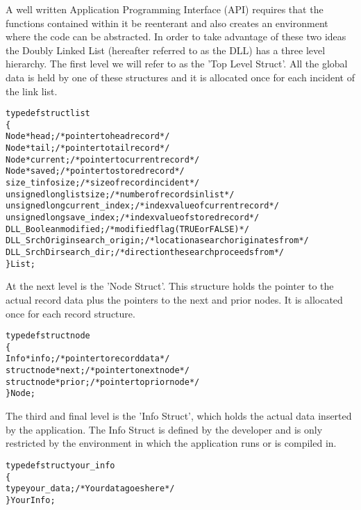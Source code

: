 \documentclass[10pt,letterpaper]{report}
\begin{document}
\noindent
A well written Application Programming Interface (API) requires that the functions contained within it be reenterant and also creates an environment where the code can be abstracted.  In order to take advantage of these two ideas the Doubly Linked List (hereafter referred to as the DLL) has a three level hierarchy.  The first level we will refer to as the 'Top Level Struct'.  All the global data is held by one of these structures and it is allocated once for each incident of the link list.  


\small
\begin{alltt}
typedef struct list
   \{
   Node           *head;         /* pointer to head record */
   Node           *tail;         /* pointer to tail record */
   Node           *current;      /* pointer to current record */
   Node           *saved;        /* pointer to stored record */
   size_t         infosize;      /* size of record incident */
   unsigned long  listsize;      /* number of records in list */
   unsigned long  current_index; /* index value of current record */
   unsigned long  save_index;    /* index value of stored record */
   DLL_Boolean    modified;      /* modified flag (TRUE or FALSE) */
   DLL_SrchOrigin search_origin; /* location a search originates from */
   DLL_SrchDir    search_dir;    /* direction the search proceeds from */
   \} List;
\end{alltt}
\normalsize
\vspace{8pt}

\noindent
At the next level is the 'Node Struct'.  This structure holds the pointer to the actual record data plus the pointers to the next and prior nodes.  It is allocated once for each record structure.

\small
\begin{alltt}
typedef struct node
   \{
   Info        *info;     /* pointer to record data */
   struct node *next;     /* pointer to next node */
   struct node *prior;    /* pointer to prior node */
   \} Node;
\end{alltt}
\normalsize
\vspace{8pt}

\noindent
The third and final level is the 'Info Struct', which holds the actual data inserted by the application.  The Info Struct is defined by the developer and is only restricted by the environment in which the application runs or is compiled in.

\small
\begin{alltt}
typedef struct your_info
   \{
   type your_data;        /* Your data goes here */
   \} YourInfo;
\end{alltt}
\normalsize
\vspace{8pt}
\end{document}
